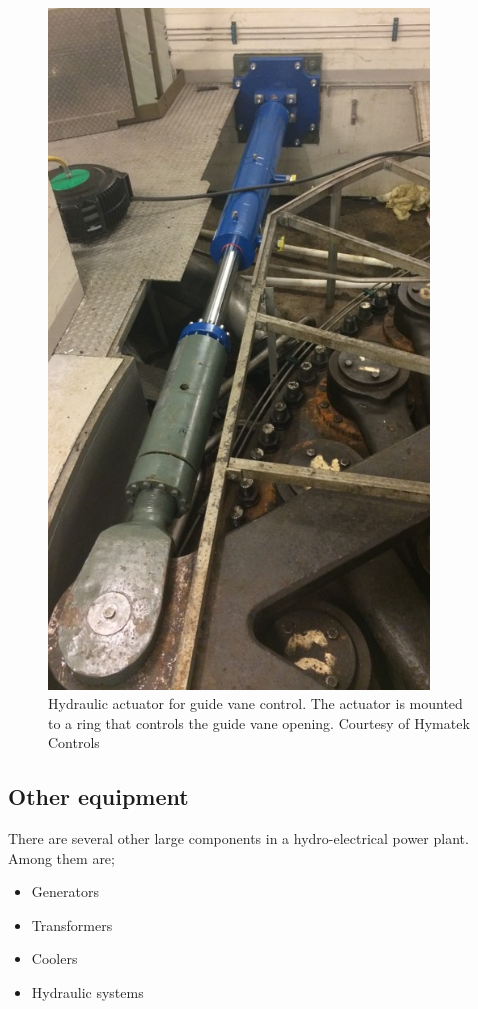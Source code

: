 \begin{figure}
\begin{minipage}[b]{0.49\linewidth}
                \includegraphics[width = 0.9\textwidth]{report/figures/introduction/servo1(1).jpg}
                \caption{Hydraulic actuator for guide vane control. The actuator is mounted to a ring that controls the guide vane opening. Courtesy of Hymatek Controls}
                \label{fig:guide_vanes}
            \end{minipage}
        \end{figure}
        
    \subsection{Other equipment}
        There are several other large components in a hydro-electrical power plant. Among them are;
        \begin{itemize}
            \item Generators
            \item Transformers
            \item Coolers
            \item Hydraulic systems
        \end{itemize}
    
